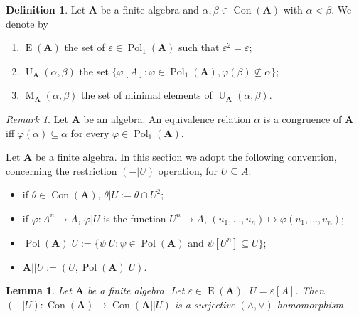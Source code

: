 \documentclass{amsart}
\theoremstyle{plain}
\newtheorem{lemma}[theorem]{Lemma}
\theoremstyle{definition}
\newtheorem{definition}[theorem]{Definition}
\theoremstyle{remark}
\newtheorem{remark}[theorem]{Remark}
\def\phi{\varphi}
\def\epsilon{\varepsilon}
\DeclareMathOperator{\Con}{Con}
\DeclareMathOperator{\Pol}{Pol}
\DeclareMathOperator{\Id}{E}
\DeclareMathOperator{\U}{U}
\DeclareMathOperator{\M}{M}
\begin{document}
\begin{definition}
    Let $\mathbf{A}$ be a finite algebra and $\alpha, \beta \in \Con(\mathbf{A})$ with $\alpha < \beta$. 
    We denote by
    \begin{enumerate}
        \item $\Id(\mathbf{A})$ the set of $ \epsilon \in \Pol_1(\mathbf{A})$ such that $\epsilon^2 = \epsilon$; 
        \item $\U_{\mathbf{A}}(\alpha, \beta)$ the set $\{\phi[A] : \phi \in \Pol_1(\mathbf{A}), \phi(\beta) \nsubseteq \alpha\}$; 
        \item $\M_{\mathbf{A}}(\alpha, \beta)$ the set of minimal elements of $\U_{\mathbf{A}}(\alpha, \beta)$. 
    \end{enumerate}
\end{definition}

\begin{remark}
    Let $\mathbf{A}$ be an algebra. 
    An equivalence relation $\alpha$ is a congruence of $\mathbf{A}$ iff $\phi(\alpha) \subseteq \alpha$ for every $\phi \in \Pol_1(\mathbf{A})$. 
\end{remark}

Let $\mathbf{A}$ be a finite algebra. 
In this section we adopt the following convention, concerning the restriction $(-|U)$ operation, for $U \subseteq A$: 
\begin{itemize}
    \item if $\theta \in \Con(\mathbf{A})$, $\theta | U := \theta \cap U^2$; 
    \item if $\phi: A^n \to A$, $\phi| U$ is the function $U^n \to A$, $(u_1, \ldots, u_n) \mapsto \phi(u_1, \ldots, u_n)$; 
    \item $\Pol(\mathbf{A})|U:=\{\psi|U : \psi \in \Pol(\mathbf{A}) \text{ and } \psi[U^n] \subseteq U \}$; 
    \item $\mathbf{A}||U := (U, \Pol(\mathbf{A})|U)$. 
\end{itemize}

\begin{lemma}
    Let $\mathbf{A}$ be a finite algebra. 
    Let $\epsilon \in \Id(\mathbf{A})$, $U=\epsilon[A]$. 
    Then $(-|U): \Con(\mathbf{A}) \to \Con(\mathbf{A}||U)$ is a surjective $(\land, \lor)$-homomorphism.
\end{lemma}
\end{document}
